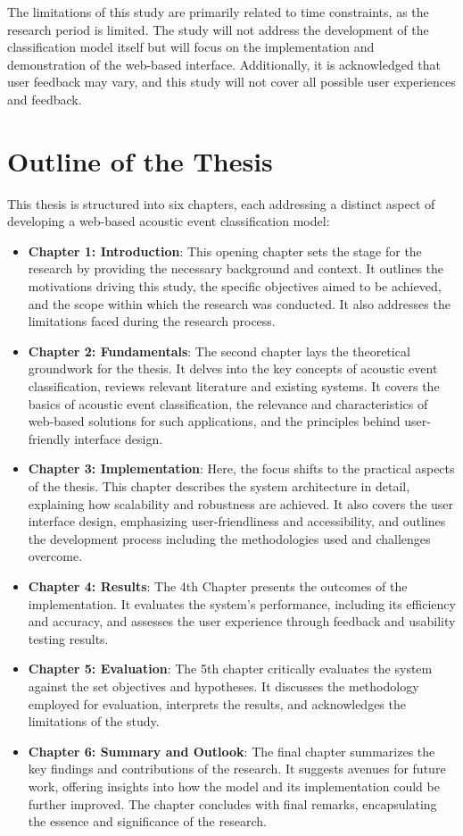 The limitations of this study are primarily related to time constraints, as the research period is limited. The study will not address the development of the classification model itself but will focus on the implementation and demonstration of the web-based interface. Additionally, it is acknowledged that user feedback may vary, and this study will not cover all possible user experiences and feedback.

\section{Outline of the Thesis}
This thesis is structured into six chapters, each addressing a distinct aspect of developing a web-based acoustic event classification model:

\begin{itemize}
  \item \textbf{Chapter 1: Introduction}: This opening chapter sets the stage for the research by providing the necessary background and context. It outlines the motivations driving this study, the specific objectives aimed to be achieved, and the scope within which the research was conducted. It also addresses the limitations faced during the research process.
  \item \textbf{Chapter 2: Fundamentals}: The second chapter lays the theoretical groundwork for the thesis. It delves into the key concepts of acoustic event classification, reviews relevant literature and existing systems. It covers the basics of acoustic event classification, the relevance and characteristics of web-based solutions for such applications, and the principles behind user-friendly interface design.
  \item \textbf{Chapter 3: Implementation}: Here, the focus shifts to the practical aspects of the thesis. This chapter describes the system architecture in detail, explaining how scalability and robustness are achieved. It also covers the user interface design, emphasizing user-friendliness and accessibility, and outlines the development process including the methodologies used and challenges overcome.
  \item \textbf{Chapter 4: Results}: The 4th Chapter presents the outcomes of the implementation. It evaluates the system’s performance, including its efficiency and accuracy, and assesses the user experience through feedback and usability testing results.
  \item \textbf{Chapter 5: Evaluation}: The 5th chapter critically evaluates the system against the set objectives and hypotheses. It discusses the methodology employed for evaluation, interprets the results, and acknowledges the limitations of the study.
  \item \textbf{Chapter 6: Summary and Outlook}: The final chapter summarizes the key findings and contributions of the research. It suggests avenues for future work, offering insights into how the model and its implementation could be further improved. The chapter concludes with final remarks, encapsulating the essence and significance of the research.


\end{itemize}
